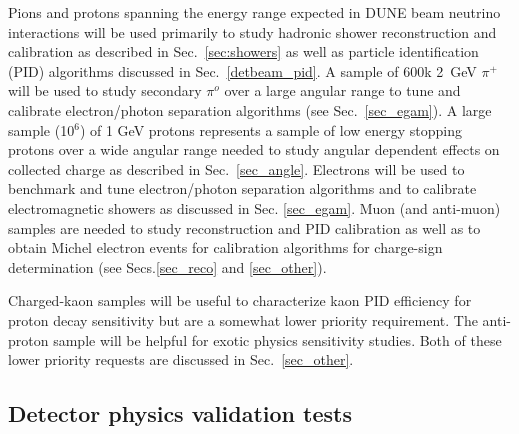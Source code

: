 Pions and protons spanning the energy range expected in DUNE beam neutrino interactions will be used 
primarily to study hadronic shower reconstruction and calibration as described in Sec.~\ref{sec:showers}
 as well as particle identification (PID) algorithms discussed in Sec.~\ref{detbeam_pid}. A sample of 600k
 2~GeV $\pi^+$ will be used to study  secondary $\pi^o$ over a large angular range 
to tune and calibrate electron/photon separation algorithms (see Sec.~\ref{sec_egam}).
A large sample (10$^{6}$) of 1 GeV protons represents a sample of low energy stopping protons over a 
wide angular range needed to study angular
dependent effects on collected charge as described in Sec.~\ref{sec_angle}.
Electrons will be used to benchmark and tune  electron/photon separation algorithms and to calibrate 
electromagnetic showers as discussed in Sec. \ref{sec_egam}.
Muon (and anti-muon) samples are needed to study reconstruction and PID calibration as well as to obtain 
Michel electron events for calibration  
algorithms for charge-sign determination (see Secs.\ref{sec_reco} and \ref{sec_other}).

Charged-kaon samples will be useful to characterize kaon PID efficiency for proton decay sensitivity but
are a somewhat lower priority requirement. The anti-proton sample
will be helpful for exotic physics sensitivity studies. Both of these lower priority requests are discussed
in Sec.~\ref{sec_other}.


\subsection{Detector physics validation tests}

